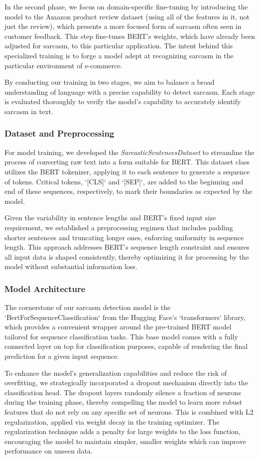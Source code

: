 \documentclass[10pt,twocolumn,letterpaper]{article}
\begin{document}
In the second phase, we focus on domain-specific fine-tuning by introducing the model to the Amazon product review dataset (using all of the features in it, not just the review), which presents a more focused form of sarcasm often seen in customer feedback. This step fine-tunes BERT's weights, which have already been adjusted for sarcasm, to this particular application. The intent behind this specialized training is to forge a model adept at recognizing sarcasm in the particular environment of e-commerce.

By conducting our training in two stages, we aim to balance a broad understanding of language with a precise capability to detect sarcasm. Each stage is evaluated thoroughly to verify the model’s capability to accurately identify sarcasm in text.  
\subsubsection{Dataset and Preprocessing}
For model training, we developed the \textit{SarcasticSentencesDataset} to streamline the process of converting raw text into a form suitable for BERT. This dataset class utilizes the BERT tokenizer, applying it to each sentence to generate a sequence of tokens. Critical tokens, `[CLS]` and `[SEP]`, are added to the beginning and end of these sequences, respectively, to mark their boundaries as expected by the model.

Given the variability in sentence lengths and BERT's fixed input size requirement, we established a preprocessing regimen that includes padding shorter sentences and truncating longer ones, enforcing uniformity in sequence length. This approach addresses BERT's sequence length constraint and ensures all input data is shaped consistently, thereby optimizing it for processing by the model without substantial information loss.

\subsubsection{Model Architecture}
The cornerstone of our sarcasm detection model is the `BertForSequenceClassification` from the Hugging Face's `transformers` library, which provides a convenient wrapper around the pre-trained BERT model tailored for sequence classification tasks. This base model comes with a fully connected layer on top for classification purposes, capable of rendering the final prediction for a given input sequence.

To enhance the model's generalization capabilities and reduce the risk of overfitting, we strategically incorporated a dropout mechanism directly into the classification head. The dropout layers randomly silence a fraction of neurons during the training phase, thereby compelling the model to learn more robust features that do not rely on any specific set of neurons. This is combined with L2 regularization, applied via weight decay in the training optimizer. The regularization technique adds a penalty for large weights to the loss function, encouraging the model to maintain simpler, smaller weights which can improve performance on unseen data.
\end{document}
